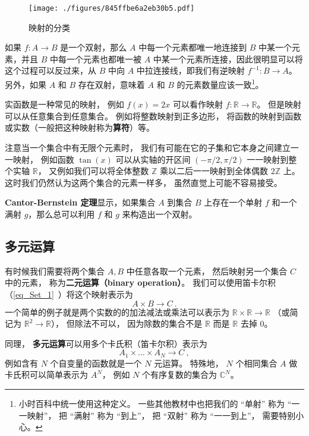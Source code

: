 \begin{figure}[ht]
\centering
\texttt{[image: ./figures/845ffbe6a2eb30b5.pdf]}
\caption{映射的分类} \label{fig_map_1}
\end{figure}

如果 $f: A \to B$ 是一个双射，那么 $A$ 中每一个元素都唯一地连接到 $B$ 中某一个元素，并且 $B$ 中每一个元素也都唯一被 $A$ 中某一个元素所连接，因此很明显可以将这个过程可以反过来，从 $B$ 中向 $A$ 中拉连接线，即我们有逆映射 $f^{-1}: B \to A$。另外，如果 $A$ 和 $B$ 存在双射，意味着 $A$ 和 $B$ 的元素数量应该一致\footnote{小时百科中统一使用这种定义。 一些其他教材中也把我们的 “单射” 称为 “一一映射”， 把 “满射” 称为 “到上”， 把 “双射” 称为 “一一到上”， 需要特别小心。}。

实函数是一种常见的映射， 例如 $f(x) = 2x$ 可以看作映射 $f: \mathbb R \to \mathbb R$。 但是映射可以从任意集合到任意集合。 例如将整数映射到正多边形， 将函数的映射到函数或实数（一般把这种映射称为\textbf{算符}）等。

注意当一个集合中有无限个元素时， 我们有可能在它的子集和它本身之间建立一一映射， 例如函数 $\tan(x)$ 可以从实轴的开区间 $(-\pi/2, \pi/2)$ 一一映射到整个实轴 $\mathbb R$， 又例如我们可以将全体整数 $\mathbb Z$ 乘以二后一一映射到全体偶数 $2\mathbb Z$ 上。 这时我们仍然认为这两个集合的元素一样多， 虽然直觉上可能不容易接受。

\textbf{Cantor-Bernstein 定理}显示，如果集合 $A$ 到集合 $B$ 上存在一个单射 $f$ 和一个满射 $g$，那么总可以利用 $f$ 和 $g$ 来构造出一个双射。

\subsection{多元运算}\label{sub_map_1}
有时候我们需要将两个集合 $A, B$ 中任意各取一个元素， 然后映射另一个集合 $C$ 中的元素， 称为\textbf{二元运算（binary operation）}。 我们可以使用笛卡尔积（\autoref{eq_Set_1}~）将这个映射表示为
\begin{equation}\label{eq_map_1}
A \times B \to C~.
\end{equation}
一个简单的例子就是两个实数的的加法减法或乘法可以表示为 $\mathbb R \times \mathbb R \to \mathbb R$ （或简记为 $\mathbb R^2 \to \mathbb R$）， 但除法不可以， 因为除数的集合不是 $\mathbb R$ 而是 $\mathbb R$ 去掉 $0$。


同理， \textbf{多元运算}可以用多个卡氏积（笛卡尔积）表示为
\begin{equation}
A_1 \times \dots \times A_N \to C~,
\end{equation}
例如含有 $N$ 个自变量的函数就是一个 $N$ 元运算。 特殊地， $N$ 个相同集合 $A$ 做卡氏积可以简单表示为 $A^N$， 例如 $N$ 个有序复数的集合为 $\mathbb C^N$。

